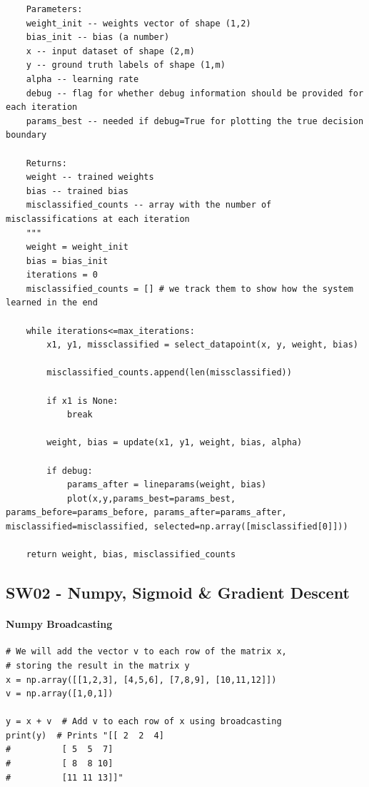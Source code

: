 \documentclass[11pt]{article}
\begin{document}
\begin{verbatim}
	Parameters:
	weight_init -- weights vector of shape (1,2)
	bias_init -- bias (a number)
	x -- input dataset of shape (2,m)
	y -- ground truth labels of shape (1,m)
	alpha -- learning rate
	debug -- flag for whether debug information should be provided for each iteration
	params_best -- needed if debug=True for plotting the true decision boundary
	
	Returns:
	weight -- trained weights
	bias -- trained bias
	misclassified_counts -- array with the number of misclassifications at each iteration
	"""
	weight = weight_init
	bias = bias_init
	iterations = 0
	misclassified_counts = [] # we track them to show how the system learned in the end 
	
	while iterations<=max_iterations:
		x1, y1, missclassified = select_datapoint(x, y, weight, bias)
		
		misclassified_counts.append(len(missclassified))
		
		if x1 is None:
			break
		
		weight, bias = update(x1, y1, weight, bias, alpha)
		
		if debug:
			params_after = lineparams(weight, bias)
			plot(x,y,params_best=params_best, params_before=params_before, params_after=params_after, misclassified=misclassified, selected=np.array([misclassified[0]]))
	
	return weight, bias, misclassified_counts
\end{verbatim}

\subsection{SW02 - Numpy, Sigmoid \& Gradient Descent}
\paragraph{Numpy Broadcasting}
\begin{verbatim}
# We will add the vector v to each row of the matrix x,
# storing the result in the matrix y
x = np.array([[1,2,3], [4,5,6], [7,8,9], [10,11,12]])
v = np.array([1,0,1])

y = x + v  # Add v to each row of x using broadcasting
print(y)  # Prints "[[ 2  2  4]
#          [ 5  5  7]
#          [ 8  8 10]
#          [11 11 13]]"
\end{verbatim}


\end{document}
